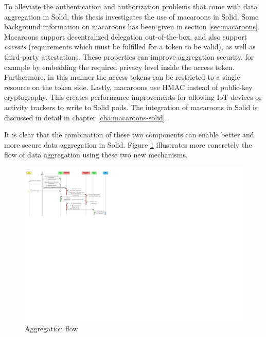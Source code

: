 To alleviate the authentication and authorization problems that come with data aggregation in Solid, this thesis investigates the use of macaroons in Solid. Some background information on macaroons has been given in section \ref{sec:macaroons}. Macaroons support decentralized delegation out-of-the-box, and also support \textit{caveats} (requirements which must be fulfilled for a token to be valid), as well as third-party attestations. These properties can improve aggregation security, for example by embedding the required privacy level inside the access token. Furthermore, in this manner the access tokens can be restricted to a single resource on the token side. Lastly, macaroons use \acrlong{HMAC} instead of public-key cryptography. This creates performance improvements for allowing IoT devices or activity trackers to write to Solid pods. The integration of macaroons in Solid is discussed in detail in chapter \ref{cha:macaroons-solid}.

It is clear that the combination of these two components can enable better and more secure data aggregation in Solid. Figure \ref{fig:aggregation-flow} illustrates more concretely the flow of data aggregation using these two new mechanisms.

\begin{figure}
    \centering
    \includegraphics[width=1.0\textwidth]{images/architecture/InteractionDiagram-Aggregation-flow.pdf}
    \caption{Aggregation flow}
    \label{fig:aggregation-flow}
\end{figure}


